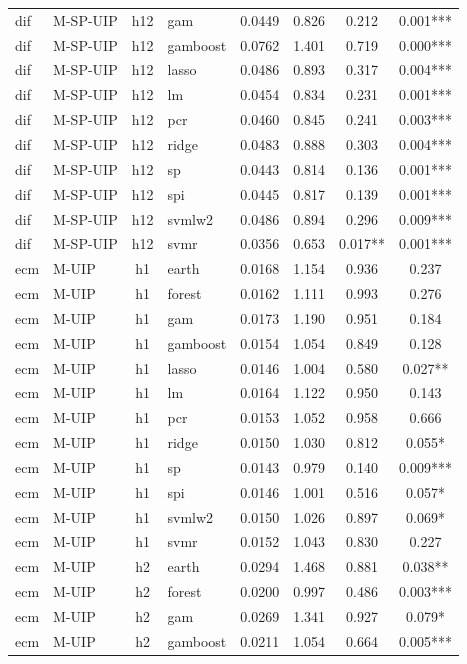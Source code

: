 \begin{ThreePartTable}
\begin{longtable}[t]{llclcccc}
dif & M-SP-UIP & h12 & gam & 0.0449 & 0.826 & 0.212 & 0.001***\\
dif & M-SP-UIP & h12 & gamboost & 0.0762 & 1.401 & 0.719 & 0.000***\\
dif & M-SP-UIP & h12 & lasso & 0.0486 & 0.893 & 0.317 & 0.004***\\
dif & M-SP-UIP & h12 & lm & 0.0454 & 0.834 & 0.231 & 0.001***\\
dif & M-SP-UIP & h12 & pcr & 0.0460 & 0.845 & 0.241 & 0.003***\\
dif & M-SP-UIP & h12 & ridge & 0.0483 & 0.888 & 0.303 & 0.004***\\
dif & M-SP-UIP & h12 & sp & 0.0443 & 0.814 & 0.136 & 0.001***\\
dif & M-SP-UIP & h12 & spi & 0.0445 & 0.817 & 0.139 & 0.001***\\
dif & M-SP-UIP & h12 & svmlw2 & 0.0486 & 0.894 & 0.296 & 0.009***\\
dif & M-SP-UIP & h12 & svmr & 0.0356 & 0.653 & 0.017** & 0.001***\\
\addlinespace
ecm & M-UIP & h1 & earth & 0.0168 & 1.154 & 0.936 & 0.237\\
ecm & M-UIP & h1 & forest & 0.0162 & 1.111 & 0.993 & 0.276\\
ecm & M-UIP & h1 & gam & 0.0173 & 1.190 & 0.951 & 0.184\\
ecm & M-UIP & h1 & gamboost & 0.0154 & 1.054 & 0.849 & 0.128\\
ecm & M-UIP & h1 & lasso & 0.0146 & 1.004 & 0.580 & 0.027**\\
ecm & M-UIP & h1 & lm & 0.0164 & 1.122 & 0.950 & 0.143\\
ecm & M-UIP & h1 & pcr & 0.0153 & 1.052 & 0.958 & 0.666\\
ecm & M-UIP & h1 & ridge & 0.0150 & 1.030 & 0.812 & 0.055*\\
ecm & M-UIP & h1 & sp & 0.0143 & 0.979 & 0.140 & 0.009***\\
ecm & M-UIP & h1 & spi & 0.0146 & 1.001 & 0.516 & 0.057*\\
ecm & M-UIP & h1 & svmlw2 & 0.0150 & 1.026 & 0.897 & 0.069*\\
ecm & M-UIP & h1 & svmr & 0.0152 & 1.043 & 0.830 & 0.227\\
\addlinespace
ecm & M-UIP & h2 & earth & 0.0294 & 1.468 & 0.881 & 0.038**\\
ecm & M-UIP & h2 & forest & 0.0200 & 0.997 & 0.486 & 0.003***\\
ecm & M-UIP & h2 & gam & 0.0269 & 1.341 & 0.927 & 0.079*\\
ecm & M-UIP & h2 & gamboost & 0.0211 & 1.054 & 0.664 & 0.005***\\

\end{longtable}
\end{ThreePartTable}
